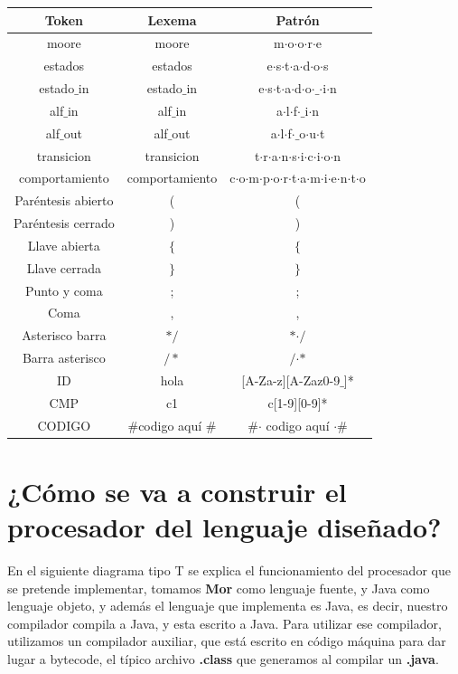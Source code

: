 \documentclass[12pt,a4paper]{article}
\begin{document}
{	\begin{center}
		\begin{tabular}{|c|c|c|}
			\hline 
			\textbf{Token} & \textbf{Lexema} & \textbf{Patrón} \\ 
			\hline 
			moore & moore & m$\cdot$o$\cdot$o$\cdot$r$\cdot$e  \\ 
			\hline 
			estados &estados & e$\cdot$s$\cdot$t$\cdot$a$\cdot$d$\cdot$o$\cdot$s \\ 
			\hline 
			estado$\_$in & estado$\_$in & e$\cdot$s$\cdot$t$\cdot$a$\cdot$d$\cdot$o$\cdot$$\_$$\cdot$i$\cdot$n \\ 
			\hline 
			alf$\_$in	& alf$\_$in & a$\cdot$l$\cdot$f$\cdot$$\_$i$\cdot$n \\ 
			\hline 
				alf$\_$out	& alf$\_$out & a$\cdot$l$\cdot$f$\cdot$$\_$o$\cdot$u$\cdot$t \\ 
			\hline 
				transicion	& transicion & t$\cdot$r$\cdot$a$\cdot$n$\cdot$s$\cdot$i$\cdot$c$\cdot$i$\cdot$o$\cdot$n \\ 
			\hline 
				comportamiento	& comportamiento & c$\cdot$o$\cdot$m$\cdot$p$\cdot$o$\cdot$r$\cdot$t$\cdot$a$\cdot$m$\cdot$i$\cdot$e$\cdot$n$\cdot$t$\cdot$o \\ 
			\hline 
			Paréntesis abierto	& ( & ( \\ 
			\hline 
			Paréntesis cerrado	& ) & ) \\ 
			\hline 
			Llave abierta	& $\{$ & $\{$ \\ 
			\hline 
			Llave cerrada	& $\}$ & $\}$ \\ 
			\hline 
			Punto y coma	& ; & ; \\ 
			\hline 
			Coma	& , &  , \\ 
			\hline
			Asterisco barra & $\ast/$  & $\ast$$\cdot/$ \\ 
			\hline 
			Barra asterisco & $/\ast$  &  $/$$\cdot$$\ast$ \\ 
			\hline  
			ID	& hola  & [A-Za-z][A-Zaz0-9$\_$]* \\ 
			\hline 
			CMP	& c1 & c[1-9][0-9]* \\ 
			\hline
		    CODIGO	& $\#$codigo aquí $\#$  & $\#$$\cdot$ codigo aquí $\cdot$$\#$\\ 
			\hline
			
		
	
		\end{tabular} 	
	\end{center}
	\newpage
	\section{¿Cómo se va a construir el procesador del lenguaje diseñado?}
	En el siguiente diagrama tipo T se explica el funcionamiento del procesador que se pretende implementar, tomamos \textbf{ Mor } como lenguaje fuente, y Java como lenguaje objeto, y además el lenguaje que implementa es Java, es decir, nuestro compilador compila a Java, y esta escrito a Java. 
	\newline
	\newline
	Para utilizar ese compilador, utilizamos un compilador auxiliar, que está escrito en código máquina para dar lugar a bytecode, el típico archivo \textbf{.class} que generamos al compilar un \textbf{.java}.
	\newline
	
}
\end{document}
